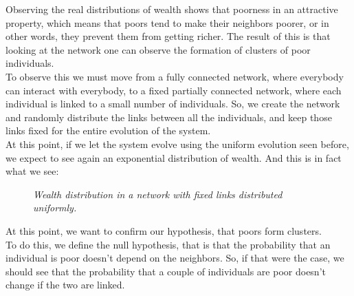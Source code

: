 Observing the real distributions of wealth shows that poorness in an attractive property, which means that poors tend to make their neighbors poorer, or in other words, they prevent them from getting richer. The result of this is that looking at the network one can observe the formation of clusters of poor individuals. \\
To observe this we must move from a fully connected network, where everybody can interact with everybody, to a fixed partially connected network, where each individual is linked to a small number of individuals. So, we create the network and randomly distribute the links between all the individuals, and keep those links fixed for the entire evolution of the system. \\
At this point, if we let the system evolve using the uniform evolution seen before, we expect to see again an exponential distribution of wealth. And this is in fact what we see:
\begin{figure}[ht!]
    \centering
    \scalebox{.7}{}
    \caption{\emph{Wealth distribution in a network with fixed links distributed uniformly.}}
    \label{fig:fixedExpo}
\end{figure}
At this point, we want to confirm our hypothesis, that poors form clusters. \\
To do this, we define the null hypothesis, that is that the probability that an individual is poor doesn't depend on the neighbors. So, if that were the case, we should see that the probability that a couple of individuals are poor doesn't change if the two are linked.
